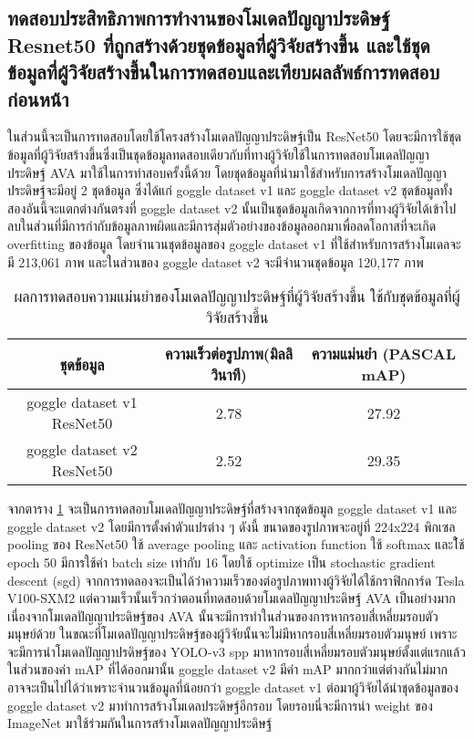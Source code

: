 \subsection{ทดสอบประสิทธิภาพการทำงานของโมเดลปัญญาประดิษฐ์ Resnet50 ที่ถูกสร้างด้วยชุดข้อมูลที่ผู้วิจัยสร้างขึ้น และใช้ชุดข้อมูลที่ผู้วิจัยสร้างขึ้นในการทดสอบและเทียบผลลัพธ์การทดสอบก่อนหน้า}
ในส่วนนี้จะเป็นการทดสอบโดยใช้โครงสร้างโมเดลปัญญาประดิษฐ์เป็น ResNet50 โดยจะมีการใช้ชุดข้อมูลที่ผู้วิจัยสร้างขึ้นซึ่งเป็นชุดข้อมูลทดสอบเดียวกับที่ทางผู้วิจัยใช้ในการทดสอบโมเดลปัญญาประดิษฐ์ AVA มาใช้ในการทำสอบครั้งนี้ด้วย โดยชุดข้อมูลที่นำมาใช้สำหรับการสร้างโมเดลปัญญาประดิษฐ์จะมีอยู่ 2 ชุดข้อมูล ซึ่งได้แก่ goggle dataset v1 และ goggle dataset v2 ชุดข้อมูลทั้งสองอันนี้จะแตกต่างกันตรงที่ goggle dataset v2 นั้นเป็นชุดข้อมูลเกิดจากการที่ทางผู้วิจัยได้เข้าไปลบในส่วนที่มีการกำกับข้อมูลภาพผิดและมีการสุ่มตัวอย่างของข้อมูลออกมาเพื่อลดโอกาสที่จะเกิด overfitting ของข้อมูล โดยจำนวนชุดข้อมูลของ goggle dataset v1 ที่ใช้สำหรับการสร้างโมเดลจะมี 213,061 ภาพ และในส่วนของ goggle dataset v2 จะมีจำนวนชุดข้อมูล 120,177 ภาพ
\clearpage
\begin{table}[!ht]
	\centering
	\begin{tabular}{|c|c|c|}
			\hline
			{ชุดข้อมูล}&{ความเร็วต่อรูปภาพ(มิลลิวินาที)}&{ความแม่นยำ (PASCAL mAP)}			\\
			\hline
			goggle dataset v1 ResNet50			& 2.78			& 27.92				\\
			goggle dataset v2 ResNet50			& 2.52			& 29.35				\\
			\hline
	\end{tabular}
\caption{ผลการทดสอบความแม่นยำของโมเดลปัญญาประดิษฐ์ที่ผู้วิจัยสร้างขึ้น ใช้กับชุดข้อมูลที่ผู้วิจัยสร้างขึ้น}
\label{tab: Test PASCAL mAP of dataset created by the researcher}
\end{table}
จากตาราง \ref{tab: Test PASCAL mAP of dataset created by the researcher} จะเป็นการทดสอบโมเดลปัญญาประดิษฐ์ที่สร้างจากชุดข้อมูล goggle dataset v1 และ goggle dataset v2 โดยมีการตั้งค่าตัวแปรต่าง ๆ ดังนี้ ขนาดของรูปภาพจะอยู่ที่ 224x224 พิกเซล pooling ของ ResNet50 ใช้ average pooling และ activation function ใช้ softmax และใ้ช้ epoch 50 มีการใช้ค่า batch size เท่ากับ 16 โดยใช้ optimize เป็น stochastic gradient descent (sgd) จากการทดลองจะเป็นได้ว่าความเร็วของต่อรูปภาพทางผู้วิจัยได้ใช้กราฟิกการ์ด Tesla V100-SXM2 แต่ความเร็วนั้นเร็วกว่าตอนที่ทดสอบด้วยโมเดลปัญญาประดิษฐ์ AVA เป็นอย่างมาก เนื่องจากโมเดลปัญญาประดิษฐ์ของ AVA นั้นจะมีการทำในส่วนของการหากรอบสี่เหลี่ยมรอบตัวมนุษย์ด้วย ในขณะที่โมเดลปัญญาประดิษฐ์ของผู้วิจัยนั้นจะไม่มีหากรอบสี่เหลี่ยมรอบตัวมนุษย์ เพราะจะมีการนำโมเดลปัญญาปรดิษฐ์ของ YOLO-v3 spp มาหากรอบสี่เหลี่ยมรอบตัวมนุษย์ตั้งแต่แรกแล้ว ในส่วนของค่า mAP ที่ได้ออกมานั้น goggle dataset v2 มีค่า mAP มากกว่าแต่ต่างกันไม่มาก อาจจะเป็นไปได้ว่าเพราะจำนวนข้อมูลที่น้อยกว่า goggle dataset v1 ต่อมาผู้วิจัยได้นำชุดข้อมูลของ goggle dataset v2 มาทำการสร้างโมเดลประดิษฐ์อีกรอบ โดยรอบนี่จะมีการนำ weight ของ ImageNet มาใช้ร่วมกันในการสร้างโมเดลปัญญาประดิษฐ์

